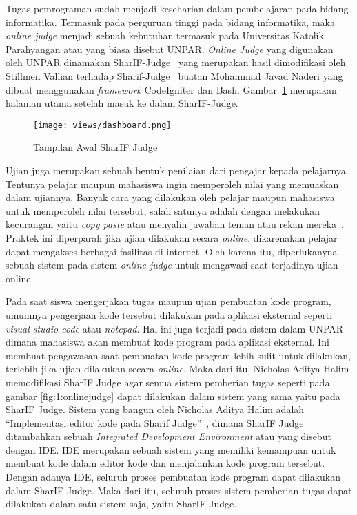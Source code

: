 Tugas pemrograman sudah menjadi keseharian dalam pembelajaran pada bidang informatika.
Termasuk pada perguruan tinggi pada bidang informatika, maka \textit{online judge} menjadi sebuah kebutuhan termasuk pada Universitas Katolik Parahyangan atau yang biasa disebut UNPAR.
\textit{Online Judge} yang digunakan oleh UNPAR dinamakan SharIF-Judge~\cite{stillmen:sharif} yang merupakan hasil dimodifikasi oleh Stillmen Vallian terhadap Sharif-Judge~\cite{javed:sharif} buatan Mohammad Javad Naderi yang dibuat menggunakan \textit{framework} CodeIgniter dan Bash. Gambar~\ref{fig:1:dashboardpng} merupakan halaman utama setelah masuk ke dalam SharIF-Judge.

\begin{figure}[H]
    \centering
    \texttt{[image: views/dashboard.png]}
    \caption[Tampilan Awal SharIF Judge]{Tampilan Awal SharIF Judge}
    \label{fig:1:dashboardpng}
\end{figure}

Ujian juga merupakan sebuah bentuk penilaian dari pengajar kepada pelajarnya. Tentunya pelajar maupun mahasiswa ingin memperoleh nilai yang memuaskan dalam ujiannya. Banyak cara yang dilakukan oleh pelajar maupun mahasiswa untuk memperoleh nilai tersebut, salah satunya adalah dengan melakukan kecurangan yaitu \textit{copy paste} atau menyalin jawaban teman atau rekan mereka~\cite{febriana:plagiarisme}. Praktek ini diperparah jika ujian dilakukan secara \textit{online}, dikarenakan pelajar dapat mengakses berbagai fasilitas di internet. Oleh karena itu, diperlukanyna sebuah sistem pada sistem \textit{online judge} untuk mengawasi saat terjadinya ujian online.

Pada saat siswa mengerjakan tugas maupun ujian pembuatan kode program, umumnya pengerjaan kode tersebut dilakukan pada aplikasi eksternal seperti \textit{visual studio code} atau \textit{notepad}. Hal ini juga terjadi pada sistem dalam UNPAR dimana mahasiswa akan membuat kode program pada aplikasi eksternal. Ini membuat pengawasan saat pembuatan kode program lebih sulit untuk dilakukan, terlebih jika ujian dilakukan secara \textit{online}. Maka dari itu, Nicholas Aditya Halim memodifikasi SharIF Judge agar semua sistem pemberian tugas seperti pada gambar \ref{fig:1:onlinejudge} dapat dilakukan dalam sistem yang sama yaitu pada SharIF Judge. Sistem yang bangun oleh Nicholas Aditya Halim adalah ``Implementasi editor kode pada Sharif Judge''~\cite{nicholas:sharif}, dimana SharIF Judge ditambahkan sebuah \textit{Integrated Development Environment} atau yang disebut dengan IDE. IDE merupakan sebuah sistem yang memiliki kemampuan untuk membuat kode dalam editor kode dan menjalankan kode program tersebut. Dengan adanya IDE, seluruh proses pembuatan kode program dapat dilakukan dalam SharIF Judge. Maka dari itu, seluruh proses sistem pemberian tugas dapat dilakukan dalam satu sistem saja, yaitu SharIF Judge.

